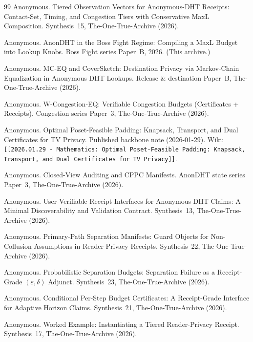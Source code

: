 \documentclass[11pt]{article}
\begin{document}
\begin{thebibliography}{99}
Anonymous.
\newblock Tiered Observation Vectors for Anonymous-DHT Receipts: Contact-Set, Timing, and Congestion Tiers with Conservative MaxL Composition.
\newblock Synthesis~15, The-One-True-Archive (2026).

Anonymous.
\newblock AnonDHT in the Boss Fight Regime: Compiling a MaxL Budget into Lookup Knobs.
\newblock Boss Fight series Paper~B, 2026. (This archive.)

Anonymous.
\newblock MC-EQ and CoverSketch: Destination Privacy via Markov-Chain Equalization in Anonymous DHT Lookups.
\newblock Release \& destination Paper~B, The-One-True-Archive (2026).

Anonymous.
\newblock W-Congestion-EQ: Verifiable Congestion Budgets (Certificates + Receipts).
\newblock Congestion series Paper~3, The-One-True-Archive (2026).

Anonymous.
\newblock Optimal Poset-Feasible Padding: Knapsack, Transport, and Dual Certificates for TV Privacy.
\newblock Published backbone note (2026-01-29). Wiki: \texttt{[[2026.01.29 - Mathematics: Optimal Poset-Feasible Padding: Knapsack, Transport, and Dual Certificates for TV Privacy]]}.

Anonymous.
\newblock Closed-View Auditing and CPPC Manifests.
\newblock AnonDHT state series Paper~3, The-One-True-Archive (2026).

Anonymous.
\newblock User-Verifiable Receipt Interfaces for Anonymous-DHT Claims: A Minimal Discoverability and Validation Contract.
\newblock Synthesis~13, The-One-True-Archive (2026).

Anonymous.
\newblock Primary-Path Separation Manifests: Guard Objects for Non-Collusion Assumptions in Reader-Privacy Receipts.
\newblock Synthesis~22, The-One-True-Archive (2026).

Anonymous.
\newblock Probabilistic Separation Budgets: Separation Failure as a Receipt-Grade $(\varepsilon,\delta)$ Adjunct.
\newblock Synthesis~23, The-One-True-Archive (2026).

Anonymous.
\newblock Conditional Per-Step Budget Certificates: A Receipt-Grade Interface for Adaptive Horizon Claims.
\newblock Synthesis~21, The-One-True-Archive (2026).

Anonymous.
\newblock Worked Example: Instantiating a Tiered Reader-Privacy Receipt.
\newblock Synthesis~17, The-One-True-Archive (2026).


\end{thebibliography}
\end{document}
